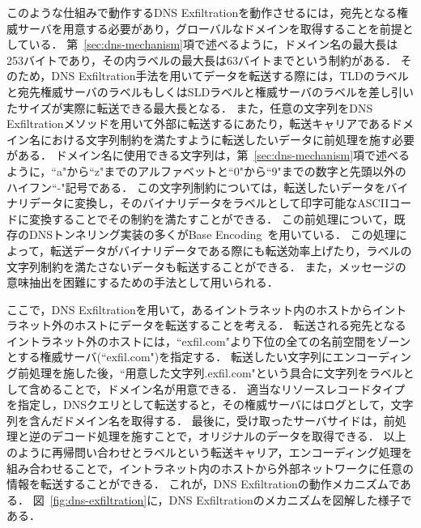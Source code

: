 このような仕組みで動作するDNS Exfiltrationを動作させるには，宛先となる権威サーバを用意する必要があり，グローバルなドメインを取得することを前提としている．
第~\ref{sec:dns-mechanism}項で述べるように，ドメイン名の最大長は253バイトであり，その内ラベルの最大長は63バイトまでという制約がある．
そのため，DNS Exfiltration手法を用いてデータを転送する際には，TLDのラベルと宛先権威サーバのラベルもしくはSLDラベルと権威サーバのラベルを差し引いたサイズが実際に転送できる最大長となる．
また，任意の文字列をDNS Exfiltrationメソッドを用いて外部に転送するにあたり，転送キャリアであるドメイン名における文字列制約を満たすように転送したいデータに前処理を施す必要がある．
ドメイン名に使用できる文字列は，第~\ref{sec:dns-mechanism}項で述べるように，``a"から``z"までのアルファベットと``0"から``9"までの数字と先頭以外のハイフン``-"記号である．
この文字列制約については，転送したいデータをバイナリデータに変換し，そのバイナリデータをラベルとして印字可能なASCIIコードに変換することでその制約を満たすことができる．
この前処理について，既存のDNSトンネリング実装の多くがBase Encoding~\cite{rfc4648}を用いている．
この処理によって，転送データがバイナリデータである際にも転送効率上げたり，ラベルの文字列制約を満たさないデータも転送することができる．
また，メッセージの意味抽出を困難にするための手法として用いられる．

ここで，DNS Exfiltrationを用いて，あるイントラネット内のホストからイントラネット外のホストにデータを転送することを考える．
転送される宛先となるイントラネット外のホストには，``exfil.com"より下位の全ての名前空間をゾーンとする権威サーバ(``exfil.com")を指定する．
転送したい文字列にエンコーディング前処理を施した後，``用意した文字列.exfil.com"という具合に文字列をラベルとして含めることで，ドメイン名が用意できる．
適当なリソースレコードタイプを指定し，DNSクエリとして転送すると，その権威サーバにはログとして，文字列を含んだドメイン名を取得する．
最後に，受け取ったサーバサイドは，前処理と逆のデコード処理を施すことで，オリジナルのデータを取得できる．
以上のように再帰問い合わせとラベルという転送キャリア，エンコーディング処理を組み合わせることで，イントラネット内のホストから外部ネットワークに任意の情報を転送することができる．
これが，DNS Exfiltrationの動作メカニズムである．
図~\ref{fig:dns-exfiltration}に，DNS Exfiltrationのメカニズムを図解した様子である．



